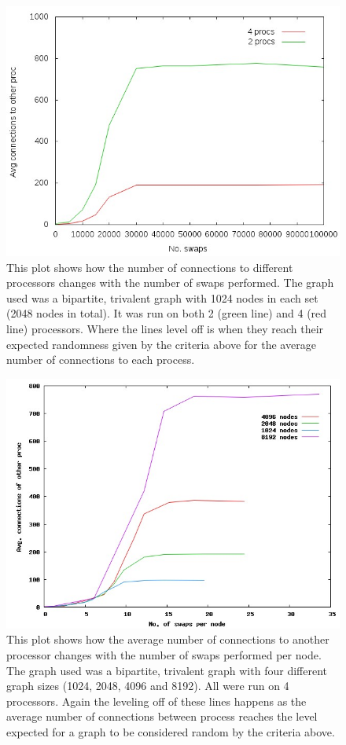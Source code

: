 \documentclass[pdftex,12pt,a4paper]{article}
\begin{document}
\begin{figure}
\centering
\includegraphics[scale=0.8]{swap_random_1024_by_2_nodegraph.jpg}
\caption{This plot shows how the number of connections to different processors changes with the number of swaps performed. The graph used was a bipartite, trivalent graph with 1024 nodes in each set (2048 nodes in total). It was run on both 2 (green line) and 4 (red line) processors. Where the lines level off is when they reach their expected randomness given by the criteria above for the average number of connections to each process.}
\end{figure}


\begin{figure}
\centering
\includegraphics[scale=0.6]{swaps_per_node.jpg}
\caption{This plot shows how the average number of connections to another processor changes with the number of swaps performed per node. The graph used was a bipartite, trivalent graph with four different graph sizes (1024, 2048, 4096 and 8192). All were run on 4 processors. Again the leveling off of these lines happens as the average number of connections between process reaches the level expected for a graph to be considered random by the criteria above.}
\end{figure}
\end{document}
